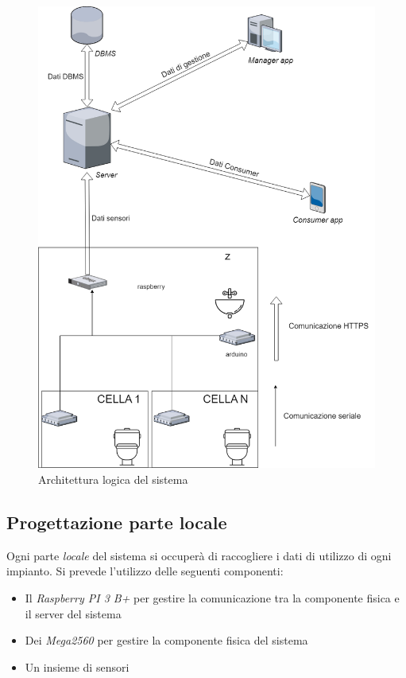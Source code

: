 \documentclass[12pt]{article}
\begin{document}
\begin{figure}[h!]
\centering
  \includegraphics[scale=0.33]{img/architettura_logica-report.png}
  \caption{Architettura logica del sistema}
\end{figure}
\subsection{Progettazione parte locale}
Ogni parte \textit{locale} del sistema si occuperà di raccogliere i dati di utilizzo di ogni impianto. Si prevede l'utilizzo delle seguenti componenti:
\begin{itemize}
\item Il \textit{Raspberry PI 3 B+} per gestire la comunicazione tra la componente fisica
 e il server del sistema
\item Dei \textit{Mega2560} per gestire la componente fisica del sistema
\item Un insieme di sensori
\end{itemize}
\end{document}
